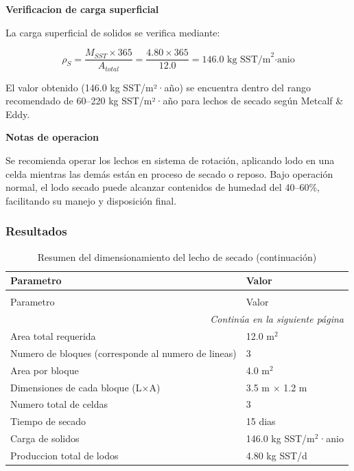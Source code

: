 \documentclass[12pt,a4paper]{article}
\begin{document}
\textbf{Verificacion de carga superficial}

La carga superficial de solidos se verifica mediante:

\begin{equation}
\rho_S = \frac{M_{SST} \times 365}{A_{total}} = \frac{4.80 \times 365}{12.0} = 146.0 \text{ kg SST/m}^2\text{·anio}
\end{equation}

El valor obtenido (146.0 kg SST/m²·año) se encuentra dentro del rango recomendado de 60--220 kg SST/m²·año para lechos de secado según Metcalf & Eddy.

\textbf{Notas de operacion}

Se recomienda operar los lechos en sistema de rotación, aplicando lodo en una celda mientras las demás están en proceso de secado o reposo. Bajo operación normal, el lodo secado puede alcanzar contenidos de humedad del 40--60\%, facilitando su manejo y disposición final.

\subsubsection{Resultados}

\begingroup
\small
\begin{longtable}{ll}
\caption{Resumen del dimensionamiento del lecho de secado}\\
\toprule
Parametro & Valor \\
\midrule
\endfirsthead
\caption[]{Resumen del dimensionamiento del lecho de secado (continuación)}\\
\toprule
Parametro & Valor \\
\midrule
\endhead
\midrule
\multicolumn{2}{r}{\textit{Continúa en la siguiente página}} \\
\endfoot
\bottomrule
\endlastfoot
Area total requerida & 12.0 m$^2$ \\
Numero de bloques (corresponde al numero de lineas) & 3 \\
Area por bloque & 4.0 m$^2$ \\
Dimensiones de cada bloque (L$\times$A) & 3.5 m $\times$ 1.2 m \\
Numero total de celdas & 3 \\
Tiempo de secado & 15 dias \\
Carga de solidos & 146.0 kg SST/m$^2$·anio \\
Produccion total de lodos & 4.80 kg SST/d \\
\end{longtable}
\endgroup
\end{document}
